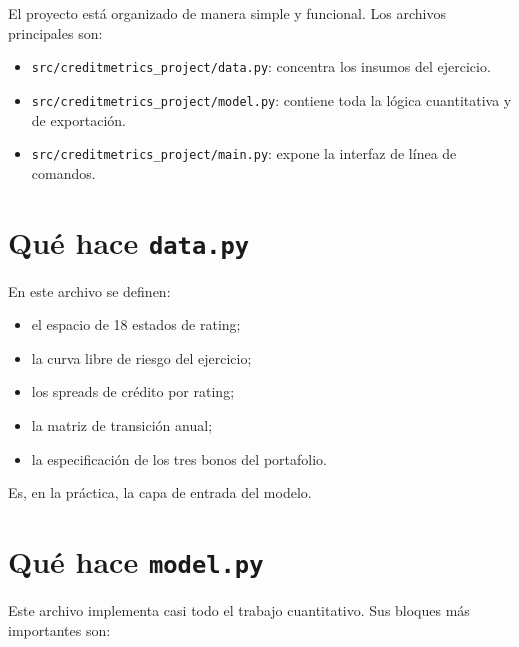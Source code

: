 El proyecto est\'a organizado de manera simple y funcional. Los archivos principales son:

\begin{itemize}
  \item \texttt{src/creditmetrics\_project/data.py}: concentra los insumos del ejercicio.
  \item \texttt{src/creditmetrics\_project/model.py}: contiene toda la l\'ogica cuantitativa y de exportaci\'on.
  \item \texttt{src/creditmetrics\_project/main.py}: expone la interfaz de l\'inea de comandos.
\end{itemize}

\section*{Qu\'e hace \texttt{data.py}}

En este archivo se definen:

\begin{itemize}
  \item el espacio de 18 estados de rating;
  \item la curva libre de riesgo del ejercicio;
  \item los spreads de cr\'edito por rating;
  \item la matriz de transici\'on anual;
  \item la especificaci\'on de los tres bonos del portafolio.
\end{itemize}

Es, en la pr\'actica, la capa de entrada del modelo.

\section*{Qu\'e hace \texttt{model.py}}

Este archivo implementa casi todo el trabajo cuantitativo. Sus bloques m\'as importantes son:

